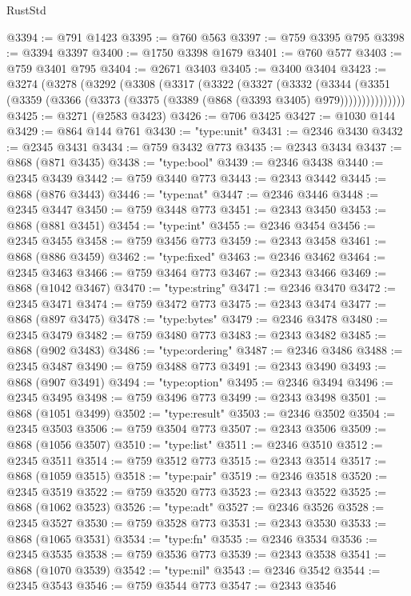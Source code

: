 \begin{lexlean}{RustStd}
\begin{coremodule}
@3394 := @791 @1423
@3395 := @760 @563
@3397 := @759 @3395 @795
@3398 := @3394 @3397
@3400 := @1750 @3398 @1679
@3401 := @760 @577
@3403 := @759 @3401 @795
@3404 := @2671 @3403
@3405 := @3400 @3404
@3423 := @3274
    (@3278
      (@3292
        (@3308
          (@3317
            (@3322
              (@3327
                (@3332
                  (@3344
                    (@3351
                      (@3359 (@3366 (@3373 (@3375 (@3389 (@868 (@3393 @3405) @979)))))))))))))))
@3425 := @3271 (@2583 @3423)
@3426 := @706 @3425
@3427 := @1030 @144
@3429 := @864 @144 @761
@3430 := "type:unit"
@3431 := @2346 @3430
@3432 := @2345 @3431
@3434 := @759 @3432 @773
@3435 := @2343 @3434
@3437 := @868 (@871 @3435)
@3438 := "type:bool"
@3439 := @2346 @3438
@3440 := @2345 @3439
@3442 := @759 @3440 @773
@3443 := @2343 @3442
@3445 := @868 (@876 @3443)
@3446 := "type:nat"
@3447 := @2346 @3446
@3448 := @2345 @3447
@3450 := @759 @3448 @773
@3451 := @2343 @3450
@3453 := @868 (@881 @3451)
@3454 := "type:int"
@3455 := @2346 @3454
@3456 := @2345 @3455
@3458 := @759 @3456 @773
@3459 := @2343 @3458
@3461 := @868 (@886 @3459)
@3462 := "type:fixed"
@3463 := @2346 @3462
@3464 := @2345 @3463
@3466 := @759 @3464 @773
@3467 := @2343 @3466
@3469 := @868 (@1042 @3467)
@3470 := "type:string"
@3471 := @2346 @3470
@3472 := @2345 @3471
@3474 := @759 @3472 @773
@3475 := @2343 @3474
@3477 := @868 (@897 @3475)
@3478 := "type:bytes"
@3479 := @2346 @3478
@3480 := @2345 @3479
@3482 := @759 @3480 @773
@3483 := @2343 @3482
@3485 := @868 (@902 @3483)
@3486 := "type:ordering"
@3487 := @2346 @3486
@3488 := @2345 @3487
@3490 := @759 @3488 @773
@3491 := @2343 @3490
@3493 := @868 (@907 @3491)
@3494 := "type:option"
@3495 := @2346 @3494
@3496 := @2345 @3495
@3498 := @759 @3496 @773
@3499 := @2343 @3498
@3501 := @868 (@1051 @3499)
@3502 := "type:result"
@3503 := @2346 @3502
@3504 := @2345 @3503
@3506 := @759 @3504 @773
@3507 := @2343 @3506
@3509 := @868 (@1056 @3507)
@3510 := "type:list"
@3511 := @2346 @3510
@3512 := @2345 @3511
@3514 := @759 @3512 @773
@3515 := @2343 @3514
@3517 := @868 (@1059 @3515)
@3518 := "type:pair"
@3519 := @2346 @3518
@3520 := @2345 @3519
@3522 := @759 @3520 @773
@3523 := @2343 @3522
@3525 := @868 (@1062 @3523)
@3526 := "type:adt"
@3527 := @2346 @3526
@3528 := @2345 @3527
@3530 := @759 @3528 @773
@3531 := @2343 @3530
@3533 := @868 (@1065 @3531)
@3534 := "type:fn"
@3535 := @2346 @3534
@3536 := @2345 @3535
@3538 := @759 @3536 @773
@3539 := @2343 @3538
@3541 := @868 (@1070 @3539)
@3542 := "type:nil"
@3543 := @2346 @3542
@3544 := @2345 @3543
@3546 := @759 @3544 @773
@3547 := @2343 @3546

\end{coremodule}
\end{lexlean}
